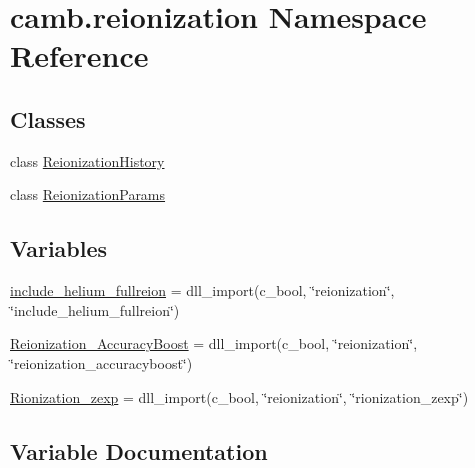 \hypertarget{namespacecamb_1_1reionization}{}\section{camb.\+reionization Namespace Reference}
\label{namespacecamb_1_1reionization}
\subsection*{Classes}
\begin{DoxyCompactItemize}
\item 
class \mbox{\hyperlink{classcamb_1_1reionization_1_1ReionizationHistory}{Reionization\+History}}
\item 
class \mbox{\hyperlink{classcamb_1_1reionization_1_1ReionizationParams}{Reionization\+Params}}
\end{DoxyCompactItemize}
\subsection*{Variables}
\begin{DoxyCompactItemize}
\item 
\mbox{\hyperlink{namespacecamb_1_1reionization_a7e1930bd04f86ddce190986f089d4c25}{include\+\_\+helium\+\_\+fullreion}} = dll\+\_\+import(c\+\_\+bool, \char`\"{}reionization\char`\"{}, \char`\"{}include\+\_\+helium\+\_\+fullreion\char`\"{})
\item 
\mbox{\hyperlink{namespacecamb_1_1reionization_a03b2a922c673270d5a36d7e882852097}{Reionization\+\_\+\+Accuracy\+Boost}} = dll\+\_\+import(c\+\_\+bool, \char`\"{}reionization\char`\"{}, \char`\"{}reionization\+\_\+accuracyboost\char`\"{})
\item 
\mbox{\hyperlink{namespacecamb_1_1reionization_a57802327e3a3b292799b0e985c31f805}{Rionization\+\_\+zexp}} = dll\+\_\+import(c\+\_\+bool, \char`\"{}reionization\char`\"{}, \char`\"{}rionization\+\_\+zexp\char`\"{})
\end{DoxyCompactItemize}


\subsection{Variable Documentation}
\mbox{\label{namespacecamb_1_1reionization_a7e1930bd04f86ddce190986f089d4c25}} 
